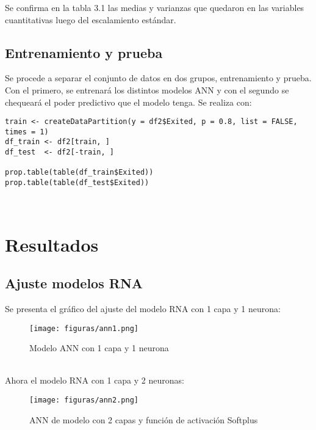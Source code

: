 \documentclass{report}
\begin{document}
Se confirma en la tabla 3.1 las medias y varianzas que quedaron en las variables cuantitativas luego del escalamiento estándar.\\

\newpage
\newpage
\section{Entrenamiento y prueba}
Se procede a separar el conjunto de datos en dos grupos, entrenamiento y prueba. Con el primero, se entrenará los distintos modelos ANN y con el segundo se chequeará el poder predictivo que el modelo tenga. Se realiza con:\\

\begin{lstlisting}[Language=R, caption={Separación en entrenamiento y prueba},captionpos=b]
train <- createDataPartition(y = df2$Exited, p = 0.8, list = FALSE, times = 1)
df_train <- df2[train, ] 
df_test  <- df2[-train, ]

prop.table(table(df_train$Exited))
prop.table(table(df_test$Exited))
\end{lstlisting}\\

\chapter{Resultados}
\section{Ajuste modelos RNA}
Se presenta el gráfico del ajuste del modelo RNA con 1 capa y 1 neurona:\\
\begin{figure}[htp]
        \centering
    	\texttt{[image: figuras/ann1.png]}
    	\label{fig: Figura1}
    	\caption{Modelo ANN con 1 capa y 1 neurona}
        \end{figure}\\
        
Ahora el modelo RNA con 1 capa y 2 neuronas:\\
\vspace{3cm}

\begin{figure}[htp]
        \centering
    	\texttt{[image: figuras/ann2.png]}
    	\label{fig: Figura1}
    	\caption{ANN de modelo con 2 capas y función de activación Softplus}
        \end{figure}\\        
\end{document}
